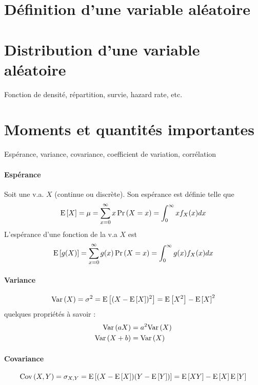 \documentclass[12pt, french]{report}
\begin{document}
\section{Définition d'une variable aléatoire}

\section{Distribution d'une variable aléatoire}
Fonction de densité, répartition, survie, hazard rate, etc.

\section{Moments et quantités importantes}
Espérance, variance, covariance, coefficient de variation, corrélation

\paragraph{Espérance} Soit une v.a. $X$ (continue ou discrète). Son espérance est définie telle que
\begin{equation}
\label{eq:esp-univarie}
\mathrm{E} \left[ X \right] = \mu = \sum_{x=0}^{\infty} x \Pr \left( X = x \right) = \int_{0}^{\infty} x f_X(x) dx
\end{equation}
L'espérance d'une fonction de la v.a $X$ est
\begin{equation}
\label{eq:esp-fct-univarie}
\mathrm{E} \left[ g(X) \right] = \sum_{x=0}^{\infty} g(x) \Pr \left( X = x \right) = \int_{0}^{\infty} g(x) f_X(x) dx
\end{equation}

\paragraph{Variance}
\begin{equation}
\label{eq:variance}
\mathrm{Var} \left( X \right) = \sigma^2 = \mathrm{E} \left[ (X - \mathrm{E} \left[ X \right])^2 \right] = \mathrm{E} \left[ X^2 \right] - \mathrm{E} \left[ X \right]^2
\end{equation}
quelques propriétés à savoir : 
\begin{align*}
\mathrm{Var} \left( aX \right) 		& = a^2 \mathrm{Var} \left( X \right) \\
\mathrm{Var} \left( X + b \right)	& = \mathrm{Var} \left( X \right)
\end{align*}

\paragraph{Covariance}
\begin{equation}
\label{eq:covariance}
\mathrm{Cov} \left( X,Y \right) =  \sigma_{X,Y} = \mathrm{E} \left[ (X-\mathrm{E} \left[ X \right])(Y - \mathrm{E} \left[ Y \right]) \right] = \mathrm{E} \left[ XY \right] - \mathrm{E} \left[ X \right] \mathrm{E} \left[ Y \right]
\end{equation}
\end{document}
